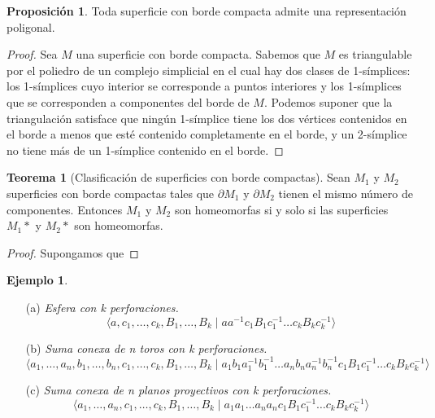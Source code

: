 \documentclass[10pt]{report}
\theoremstyle{definition}
\newtheorem{tma}[defin]{Teorema}
\newtheorem{prop}[defin]{Proposición}
\newtheorem{eje}[defin]{Ejemplo}
\begin{document}
\begin{prop}
Toda superficie con borde compacta admite una representación poligonal.
\end{prop}
\begin{proof}
Sea $M$ una superficie con borde compacta. Sabemos que $M$ es triangulable por el poliedro de un complejo simplicial en el cual hay dos clases de 1-símplices: los 1-símplices cuyo interior se corresponde a puntos interiores y los 1-símplices que se corresponden a componentes del borde de $M$. Podemos suponer que la triangulación satisface que ningún 1-símplice tiene los dos vértices contenidos en el borde a menos que esté contenido completamente en el borde, y un 2-símplice no tiene más de un 1-símplice contenido en el borde.
\end{proof}

\begin{tma}[Clasificación de superficies con borde compactas]
Sean $M_1$ y $M_2$ superficies con borde compactas tales que $\partial M_1$ y $\partial M_2$ tienen el mismo número de componentes. Entonces $M_1$ y $M_2$ son homeomorfas si y solo si las superficies $M_1*$ y $M_2*$  son homeomorfas.
\end{tma}
\begin{proof}
Supongamos que 
\end{proof}



\begin{eje}
\begin{itemize}
\item [(a)] \textit{Esfera con k perforaciones.} 
$$\langle a, c_1,\dots ,c_k, B_1, \dots ,B_k \mid aa^{-1}c_1B_1c_1^{-1}\dots c_kB_kc_k^{-1}\rangle$$ 
\item[(b)] \textit{Suma conexa de n toros con k perforaciones.}
$$\langle a_1,\dots ,a_n, b_1,\dots ,b_n, c_1,\dots ,c_k, B_1,\dots ,B_k\mid a_1b_1a_1^{-1}b_1^{-1}\dots a_nb_na_n^{-1}b_n^{-1}c_1B_1c_1^{-1}\dots c_kB_kc_k^{-1}\rangle$$
\item[(c)] \textit{Suma conexa de n planos proyectivos con k perforaciones.} 
$$\langle a_1,\dots ,a_n, c_1,\dots ,c_k, B_1,\dots ,B_k\mid a_1a_1\dots a_na_nc_1B_1c_1^{-1}\dots c_kB_kc_k^{-1} \rangle$$
\end{itemize}
\end{eje}
\end{document}
